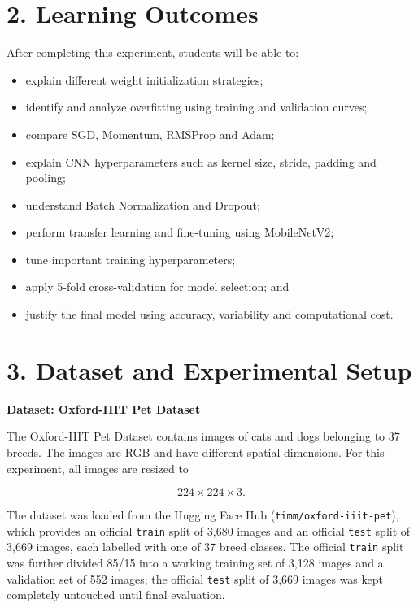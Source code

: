 \documentclass[10pt]{article}
\begin{document}
\section*{2. Learning Outcomes}

After completing this experiment, students will be able to:

\begin{itemize}
\item explain different weight initialization strategies;
\item identify and analyze overfitting using training and validation curves;
\item compare SGD, Momentum, RMSProp and Adam;
\item explain CNN hyperparameters such as kernel size, stride, padding and pooling;
\item understand Batch Normalization and Dropout;
\item perform transfer learning and fine-tuning using MobileNetV2;
\item tune important training hyperparameters;
\item apply 5-fold cross-validation for model selection; and
\item justify the final model using accuracy, variability and computational cost.
\end{itemize}

\section*{3. Dataset and Experimental Setup}

\textbf{Dataset: Oxford-IIIT Pet Dataset}

The Oxford-IIIT Pet Dataset contains images of cats and dogs belonging
to 37 breeds. The images are RGB and have different spatial dimensions.
For this experiment, all images are resized to

\[
224\times224\times3.
\]

The dataset was loaded from the Hugging Face Hub (\texttt{timm/oxford-iiit-pet}),
which provides an official \texttt{train} split of 3{,}680 images and an official
\texttt{test} split of 3{,}669 images, each labelled with one of 37 breed classes.
The official \texttt{train} split was further divided 85/15 into a working training
set of 3{,}128 images and a validation set of 552 images; the official \texttt{test}
split of 3{,}669 images was kept completely untouched until final evaluation.
\end{document}
